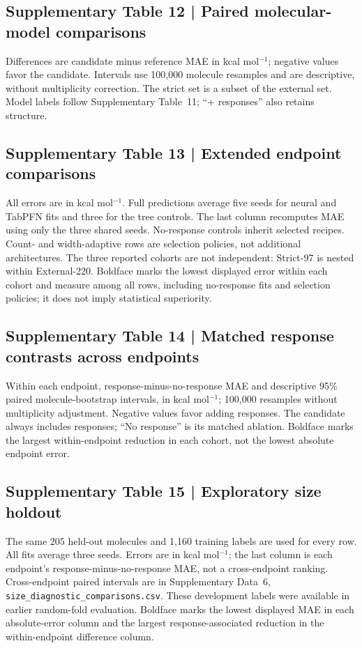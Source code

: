 \clearpage
\subsection*{Supplementary Table 12 | Paired molecular-model comparisons}
\small
Differences are candidate minus reference MAE in kcal mol$^{-1}$; negative values
favor the candidate. Intervals use 100,000 molecule resamples and are descriptive,
without multiplicity correction. The strict set is a subset of the external set.
Model labels follow Supplementary Table~11; ``+ responses'' also retains structure.

\normalsize

\clearpage
\subsection*{Supplementary Table 13 | Extended endpoint comparisons}
\small
All errors are in kcal mol$^{-1}$. Full predictions average five seeds for neural
and TabPFN fits and three for the tree controls. The last column recomputes MAE
using only the three shared seeds. No-response controls inherit selected recipes.
Count- and width-adaptive rows are selection policies, not additional architectures.
The three reported cohorts are not independent: Strict-97 is nested within External-220.
Boldface marks the lowest displayed error within each cohort and measure among
all rows, including no-response fits and selection policies; it does not imply
statistical superiority.

\normalsize

\clearpage
\subsection*{Supplementary Table 14 | Matched response contrasts across endpoints}
\small
Within each endpoint, response-minus-no-response MAE and descriptive 95\%
paired molecule-bootstrap intervals, in kcal mol$^{-1}$; 100,000 resamples
without multiplicity adjustment. Negative values favor adding responses.
The candidate always includes responses; ``No response'' is its matched ablation.
Boldface marks the largest within-endpoint reduction in each cohort, not the
lowest absolute endpoint error.

\normalsize

\clearpage
\subsection*{Supplementary Table 15 | Exploratory size holdout}
\small
The same 205 held-out molecules and 1,160 training labels are used for every row.
All fits average three seeds. Errors are in kcal mol$^{-1}$; the last column
is each endpoint's response-minus-no-response MAE, not a cross-endpoint ranking.
Cross-endpoint paired intervals are in Supplementary Data~6,
\nolinkurl{size_diagnostic_comparisons.csv}.
These development labels were available in earlier random-fold evaluation.
Boldface marks the lowest displayed MAE in each absolute-error column and the
largest response-associated reduction in the within-endpoint difference column.

\normalsize

